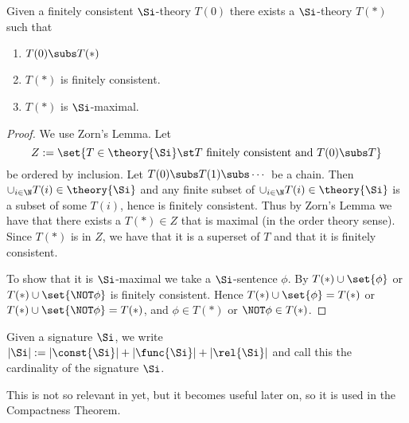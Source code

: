 \begin{prop}
    Given a finitely consistent $\Si$-theory $T(0)$
    there exists a $\Si$-theory $T(*)$ such that 
    \begin{enumerate}
        \item $T(0) \subs T(*)$
        \item $T(*)$ is finitely consistent.
        \item $T(*)$ is $\Si$-maximal.
    \end{enumerate}
\end{prop}
\begin{proof}
    We use Zorn's Lemma.
    Let 
    \[Z := \set{T \in \theory{\Si} \st T 
    \text{ finitely consistent and } T(0) \subs T}\]
    be ordered by inclusion.
    Let $T(0) \subs T(1) \subs \cdots $ be a chain.
    Then $\cup_{i \in \N} T(i) \in \theory{\Si}$
    and any finite subset of 
    $\cup_{i \in \N} T(i) \in \theory{\Si}$ 
    is a subset of some $T(i)$,
    hence is finitely consistent.
    Thus by Zorn's Lemma we have that there exists a $T(*) \in Z$
    that is maximal (in the order theory sense).
    Since $T(*)$ is in $Z$, 
    we have that it is a superset of $T$ 
    and that it is finitely consistent.
    
    To show that it is $\Si$-maximal we take a $\Si$-sentence $\phi$.
    By  
    $T(*) \cup \set{\phi}$ or 
    $T(*) \cup \set{\NOT \phi}$ is finitely consistent.
    Hence 
    $T(*) \cup \set{\phi} = T(*)$ or 
    $T(*) \cup \set{\NOT \phi} = T(*)$,
    and $\phi \in T(*)$ or $\NOT \phi \in T(*)$.
\end{proof}

\begin{nttn}
    Given a signature $\Si$, 
    we write
    $|\Si| := |\const{\Si}| + |\func{\Si}| + |\rel{\Si}|$
    and call this the cardinality of the signature $\Si$.
\end{nttn}
This is not so relevant in yet, but it becomes useful later on, 
so it is used in the Compactness Theorem.

